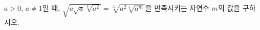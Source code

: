 $a>0$, $a\ne 1$일 때, $\sqrt{a\sqrt{a}\sqrt[3]{a^2}}=\sqrt[3]{a^2\sqrt[4]{a^m}}$을 만족시키는 자연수 $m$의 값을 구하시오.
